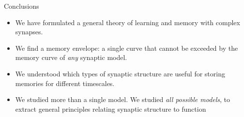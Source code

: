 \documentclass[final]{beamer}%
\begin{document}
%
%
%
%

\begin{frame}{Conclusions}
%
  \begin{itemize}
    \item We have formulated a general theory of learning and memory with complex synapses.
    \vp\item We find a memory envelope: a single curve that cannot be exceeded by the memory curve of \emph{any} synaptic model.
    \vp\item We understood which types of synaptic structure are useful for storing memories for different timescales.
    \vp\item We studied more than a single model. We studied \emph{all possible models}, to extract general principles relating synaptic structure to function
  \end{itemize}

%
\end{frame}
\end{document}
